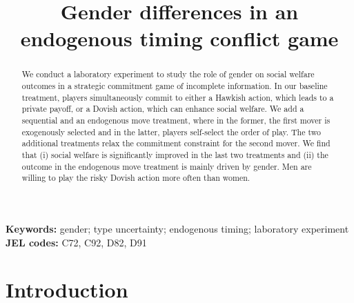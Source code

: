 \documentclass[11pt,english]{article}
\begin{document}
\title{Gender differences in an endogenous timing conflict game }

\maketitle
\begin{abstract}

We conduct a laboratory experiment to study the role of gender on social welfare outcomes in a strategic commitment game of incomplete information. In our baseline treatment, players simultaneously commit to either a Hawkish action, which leads to a private payoff, or a Dovish action, which can enhance social welfare. We add a sequential and an endogenous move treatment, where in the former, the first mover is exogenously selected and in the latter, players self-select the order of play. The two additional treatments relax the commitment constraint for the second mover. We find that (i) social welfare is significantly improved in the last two treatments and (ii) the outcome in the endogenous move treatment is mainly driven by gender. Men are willing to play the risky Dovish action more often than women. 
\end{abstract}
\textbf{Keywords:}
gender; type uncertainty; endogenous timing; laboratory experiment\\
\textbf{JEL codes:} C72, C92, D82, D91
\newpage
\section{Introduction}
\label{sec:intro}
\end{document}
